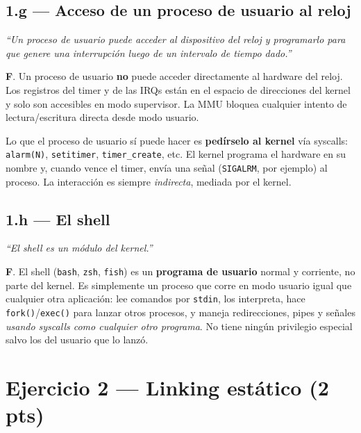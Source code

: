 \documentclass[11pt,a4paper]{article}
\begin{document}
\subsection*{1.g --- Acceso de un proceso de usuario al reloj}

\emph{``Un proceso de usuario puede acceder al dispositivo del reloj y
programarlo para que genere una interrupción luego de un intervalo de
tiempo dado.''}

\begin{respuesta}
\textbf{F}. Un proceso de usuario \textbf{no} puede acceder
directamente al hardware del reloj. Los registros del timer y de las
IRQs están en el espacio de direcciones del kernel y solo son
accesibles en modo supervisor. La MMU bloquea cualquier intento de
lectura/escritura directa desde modo usuario.

Lo que el proceso de usuario sí puede hacer es \textbf{pedírselo al
kernel} vía syscalls: \texttt{alarm(N)}, \texttt{setitimer},
\texttt{timer\_create}, etc. El kernel programa el hardware en su
nombre y, cuando vence el timer, envía una señal (\texttt{SIGALRM},
por ejemplo) al proceso. La interacción es siempre \emph{indirecta},
mediada por el kernel.
\end{respuesta}

\subsection*{1.h --- El shell}

\emph{``El \emph{shell} es un módulo del kernel.''}

\begin{respuesta}
\textbf{F}. El shell (\texttt{bash}, \texttt{zsh}, \texttt{fish}) es
un \textbf{programa de usuario} normal y corriente, no parte del
kernel. Es simplemente un proceso que corre en modo usuario igual que
cualquier otra aplicación: lee comandos por \texttt{stdin}, los
interpreta, hace \texttt{fork()}/\texttt{exec()} para lanzar otros
procesos, y maneja redirecciones, pipes y señales \emph{usando
syscalls como cualquier otro programa}. No tiene ningún privilegio
especial salvo los del usuario que lo lanzó.
\end{respuesta}

\section{Ejercicio 2 --- Linking estático (2 pts)}
\end{document}
